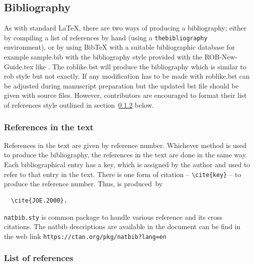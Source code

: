 \documentclass[DTMColor]{ROB-New}
\begin{document}
\subsection{Bibliography}

As with standard LaTeX, there are two ways of producing a bibliography;
either by compiling a list of references by hand (using a
\verb"thebibliography" environment), or by using BibTeX with a suitable
bibliographic database for example sample.bib with the bibliography style provided with the ROB-New-Guide.tex like \verb"". The roblike.bst will produce the bibliography which is similar to rob style but not exactly. If any modification has to be made with roblike.bst can be adjusted during manuscript preparation but the updated bst file should be given with source files. However, contributors are encouraged to format their list of references style outlined in section~\ref{fullref} below.

\subsubsection{References in the text}

References in the text are given by reference number.
Whichever method is used to produce the bibliography, the references in
the text are done in the same way. Each bibliographical entry has a key,
which is assigned by the author and used to refer to that entry in the
text. There is one form of citation -- \verb"\cite{key}" -- to produce the
reference number. Thus, \cite{JOE.2000} is produced~by
\begin{verbatim}
  \cite{JOE.2000}.
\end{verbatim}

\verb"natbib.sty" is common package to handle various reference and its cross citations. The natbib descriptions are available in the document can be find in the web link \verb"https://ctan.org/pkg/natbib?lang=en"

\subsubsection{List of references}\label{fullref}
\end{document}
